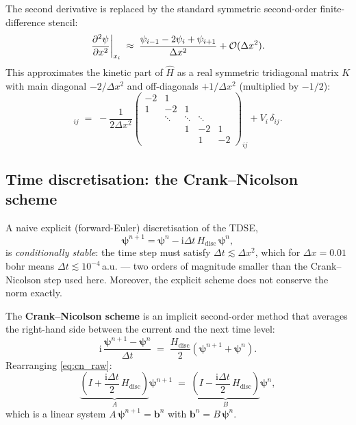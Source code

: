 \documentclass[12pt, a4paper]{article}
\newcommand{\dt}{\Delta t}
\newcommand{\dx}{\Delta x}
\newcommand{\ii}{\mathrm{i}}          %
\newcommand{\CN}{Crank--Nicolson}
\newcommand{\Htop}{\hat{H}}
\begin{document}
The second derivative is replaced by the standard symmetric
second-order finite-difference stencil:
\begin{equation}
  \pdv[2]{\psi}{x}\bigg|_{x_i}
  \;\approx\;
  \frac{\psi_{i-1} - 2\psi_i + \psi_{i+1}}{\dx^2}
  + \mathcal{O}(\dx^2).
  \label{eq:fd_stencil}
\end{equation}
This approximates the kinetic part of $\Htop$ as a real symmetric
tridiagonal matrix $K$ with main diagonal $-2/\dx^2$ and off-diagonals
$+1/\dx^2$ (multiplied by $-1/2$):
\begin{equation}
  [H_\text{disc}]_{ij}
  \;=\;
  -\frac{1}{2\dx^2}\begin{pmatrix}
    -2 & 1 \\
    1 & -2 & 1 \\
      & \ddots & \ddots & \ddots \\
      &        & 1 & -2 & 1 \\
      &        &   & 1  & -2
  \end{pmatrix}_{ij}
  + V_i\,\delta_{ij}.
  \label{eq:Hdisc}
\end{equation}

\subsection{Time discretisation: the Crank--Nicolson scheme}

A naive explicit (forward-Euler) discretisation of the TDSE,
\begin{equation}
  \boldsymbol{\psi}^{n+1} = \boldsymbol{\psi}^n
  - \ii\dt\, H_\text{disc}\,\boldsymbol{\psi}^n,
\end{equation}
is \emph{conditionally stable}: the time step must satisfy
$\dt \lesssim \dx^2$, which for $\dx = 0.01$\,bohr means
$\dt \lesssim 10^{-4}$\,a.u. — two orders of magnitude smaller than the
\CN{} step used here.  Moreover, the explicit scheme does not conserve
the norm exactly.

The \textbf{\CN{} scheme} \cite{CrankNicolson1947} is an implicit
second-order method that averages the right-hand side between the current
and the next time level:
\begin{equation}
  \ii\,\frac{\boldsymbol{\psi}^{n+1} - \boldsymbol{\psi}^n}{\dt}
  \;=\;
  \frac{H_\text{disc}}{2}\!\left(\boldsymbol{\psi}^{n+1}
  + \boldsymbol{\psi}^n\right).
  \label{eq:cn_raw}
\end{equation}
Rearranging \eqref{eq:cn_raw}:
\begin{equation}
  \underbrace{\left(I + \frac{\ii\dt}{2}\,H_\text{disc}\right)}_{A}
  \boldsymbol{\psi}^{n+1}
  \;=\;
  \underbrace{\left(I - \frac{\ii\dt}{2}\,H_\text{disc}\right)}_{B}
  \boldsymbol{\psi}^n,
  \label{eq:cn_system}
\end{equation}
which is a linear system $A\,\boldsymbol{\psi}^{n+1} = \mathbf{b}^n$
with $\mathbf{b}^n = B\,\boldsymbol{\psi}^n$.
\end{document}
